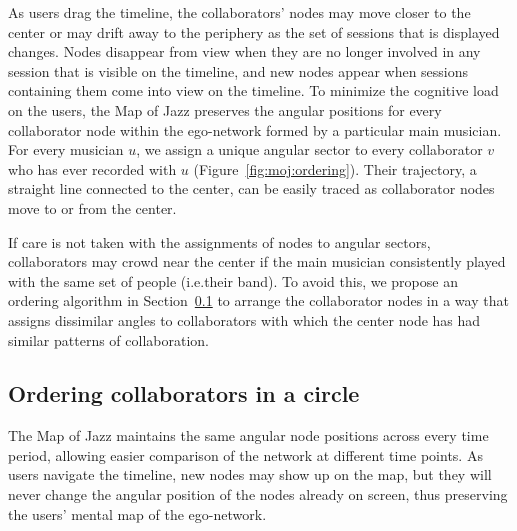 \documentclass[12pt]{cmuthesis}
\begin{document}
  As users drag the timeline, the collaborators' nodes may move closer to the center or may drift away to the periphery as the set of sessions that is displayed changes. Nodes disappear from view when they are no longer involved in any session that is visible on the timeline, and new nodes appear when sessions containing them come into view on the timeline. To minimize the cognitive load on the users, the Map of Jazz preserves the angular positions for every collaborator node within the ego-network formed by a particular main musician. For every musician $u$, we assign a unique angular sector to every collaborator $v$ who has ever recorded with $u$ (Figure~\ref{fig:moj:ordering}). Their trajectory, a straight line connected to the center, can be easily traced as collaborator nodes move to or from the center.

  If care is not taken with the assignments of nodes to angular sectors, collaborators may crowd near the center if the main musician consistently played with the same set of people (i.e.\@ their band). To avoid this, we propose an ordering algorithm in Section~\ref{sec:moj:ordering} to arrange the collaborator nodes in a way that assigns dissimilar angles to collaborators with which the center node has had similar patterns of collaboration.




  \subsection{Ordering collaborators in a circle}
  \label{sec:moj:ordering}


  The Map of Jazz maintains the same angular node positions across every time
  period, allowing easier comparison of the network at different time points. As
  users navigate the timeline, new nodes may show up on the map, but they will
  never change the angular position of the nodes already on screen, thus
  preserving the users' mental map of the ego-network.
\end{document}
